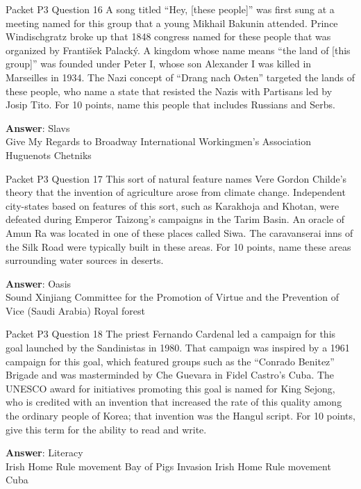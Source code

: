 \begin{frame}{Packet P3 Question 16}
A song titled “Hey, [these   people]” was first sung at a meeting named for this group that a young Mikhail Bakunin attended. Prince Windischgratz broke up that 1848 congress named for these people that was organized by František Palacký. A kingdom whose name means “the land of [this group]” was founded under Peter I, whose   son Alexander I was killed in Marseilles in 1934. The Nazi   concept of “Drang nach Osten” targeted the lands of these people, who name a state that resisted the Nazis with Partisans led by Josip Tito. For 10 points, name this people that includes Russians and Serbs.  

\textbf{Answer}: Slavs\\
 Give My Regards to Broadway
 International Workingmen's Association
 Huguenots
 Chetniks
\end{frame}

\begin{frame}{Packet P3 Question 17}
This sort of natural feature   names Vere Gordon Childe’s theory that the invention of agriculture arose from climate change. Independent city-states based on features of this sort, such as Karakhoja and Khotan, were defeated during Emperor Taizong’s campaigns in the Tarim Basin. An oracle of Amun Ra was located in one of these places called Siwa. The caravanserai inns of the Silk Road were typically built in these areas. For 10 points, name these areas surrounding water sources in deserts.      

\textbf{Answer}: Oasis\\
 Sound
 Xinjiang
 Committee for the Promotion of Virtue and the Prevention of Vice (Saudi Arabia)
 Royal forest
\end{frame}

\begin{frame}{Packet P3 Question 18}
The priest Fernando Cardenal led a campaign for this goal launched by the Sandinistas in 1980. That campaign was inspired by a 1961 campaign for this goal, which   featured groups such as the “Conrado Benitez” Brigade and was masterminded by Che Guevara in Fidel Castro’s   Cuba. The UNESCO award for initiatives promoting this goal is named for   King Sejong, who is credited with an invention that increased the rate of this quality among the ordinary people of Korea; that invention was the Hangul script. For 10 points, give this term for the ability to read and write.  

\textbf{Answer}: Literacy\\
 Irish Home Rule movement
 Bay of Pigs Invasion
 Irish Home Rule movement
 Cuba
\end{frame}

